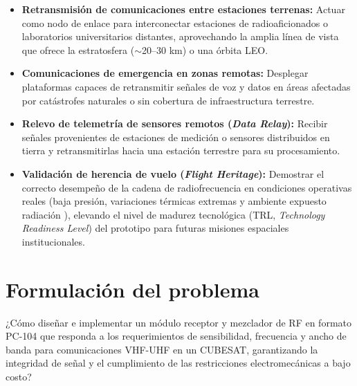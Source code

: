 \documentclass[11pt,a4paper,twoside]{report}
\begin{document}
	\begin{itemize}
		\item \textbf{Retransmisión de comunicaciones entre estaciones terrenas:} Actuar como nodo de enlace para interconectar estaciones de radioaficionados o laboratorios universitarios distantes, aprovechando la amplia línea de vista que ofrece la estratosfera ($\sim$20--30 km) o una órbita LEO.
		
		\item \textbf{Comunicaciones de emergencia en zonas remotas:} Desplegar plataformas capaces de retransmitir señales de voz y datos en áreas afectadas por catástrofes naturales o sin cobertura de infraestructura terrestre.
		
		\item \textbf{Relevo de telemetría de sensores remotos (\textit{Data Relay}):} Recibir señales provenientes de estaciones de medición o sensores distribuidos en tierra y retransmitirlas hacia una estación terrestre para su procesamiento.
		
		\item \textbf{Validación de herencia de vuelo (\textit{Flight Heritage}):} Demostrar el correcto desempeño de la cadena de radiofrecuencia en condiciones operativas reales (baja presión, variaciones térmicas extremas y ambiente expuesto radiación ), elevando el nivel de madurez tecnológica (TRL, \textit{Technology Readiness Level}) del prototipo para futuras misiones espaciales institucionales.
	\end{itemize}
	
	\section{Formulación del problema}
	¿Cómo diseñar e implementar un módulo receptor y mezclador de RF en formato PC-104 que responda a los requerimientos de sensibilidad, frecuencia y ancho de banda para comunicaciones VHF-UHF en un CUBESAT, garantizando la integridad de señal y el cumplimiento de las restricciones electromecánicas a bajo costo?
	
\end{document}
